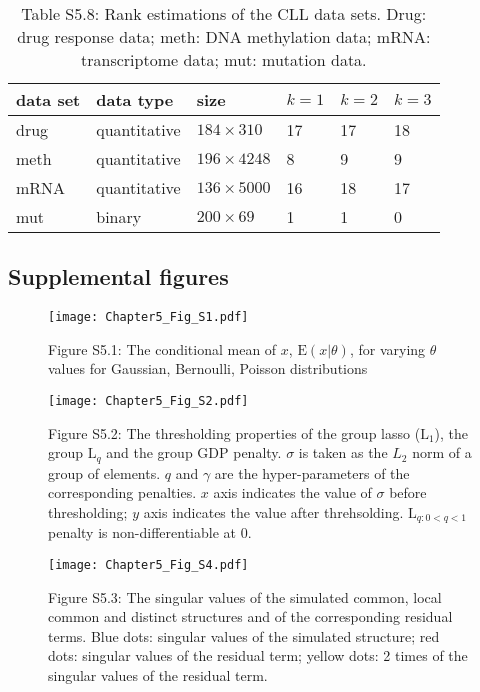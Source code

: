 \begin{table}[htbp]
\centering
\caption*{Table S5.8: Rank estimations of the CLL data sets. Drug: drug response data; meth: DNA methylation data; mRNA: transcriptome data; mut: mutation data.}
\label{chapter5_tab:S8}
\begin{tabular}{llllll}
  \toprule
  data set & data type    & size              & $k=1$ & $k=2$ & $k=3$ \\
  \midrule
  drug     & quantitative & $184 \times 310$  & 17 & 17 & 18   \\
  meth     & quantitative & $196 \times 4248$ & 8  & 9  & 9   \\
  mRNA     & quantitative & $136 \times 5000$ & 16 & 18 & 17   \\
  mut      & binary       & $200 \times 69$   & 1  & 1  & 0   \\
  \bottomrule
\end{tabular}
\end{table}

\subsection{Supplemental figures}
\begin{figure}[htbp]
    \centering
    \texttt{[image: Chapter5\_Fig\_S1.pdf]}
    \caption*{Figure S5.1: The conditional mean of $x$, $\text{E}(x|\theta)$, for varying $\theta$ values for Gaussian, Bernoulli, Poisson distributions}
	\label{chapter5_fig:S1}
\end{figure}

\begin{figure}[h]
    \centering
    \texttt{[image: Chapter5\_Fig\_S2.pdf]}
    \caption*{Figure S5.2: The thresholding properties of the group lasso ($\text{L}_1$), the group $\text{L}_{q}$ and the group GDP penalty. $\sigma$ is taken as the $L_2$ norm of a group of elements. $q$ and $\gamma$ are the hyper-parameters of the corresponding penalties. $x$ axis indicates the value of $\sigma$ before thresholding; $y$ axis indicates the value after threhsolding. $\text{L}_{q: 0<q < 1}$ penalty is non-differentiable at 0.}
	\label{chapter5_fig:S2}
\end{figure}

\begin{figure}[htbp]
    \centering
    \texttt{[image: Chapter5\_Fig\_S4.pdf]}
    \caption*{Figure S5.3: The singular values of the simulated common, local common and distinct structures and of the corresponding residual terms. Blue dots: singular values of the simulated structure; red dots: singular values of the residual term; yellow dots: 2 times of the singular values of the residual term.}
	\label{chapter5_fig:S4}
\end{figure}

